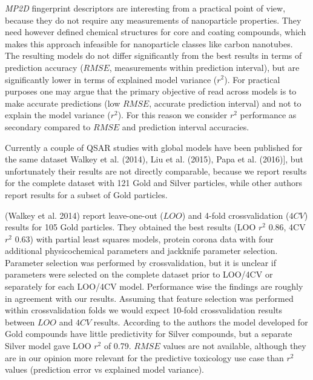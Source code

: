 \documentclass[utf8]{frontiersHLTH} %
\begin{document}
\emph{MP2D} fingerprint descriptors are interesting from a practical
point of view, because they do not require any measurements of
nanoparticle properties. They need however defined chemical structures
for core and coating compounds, which makes this approach infeasible for
nanoparticle classes like carbon nanotubes. The resulting models do not
differ significantly from the best results in terms of prediction
accuracy (\(RMSE\), measurements within prediction interval), but are
significantly lower in terms of explained model variance (\(r^2\)). For
practical purposes one may argue that the primary objective of read
across models is to make accurate predictions (low \(RMSE\), accurate
prediction interval) and not to explain the model variance (\(r^2\)).
For this reason we consider \(r^2\) performance as secondary compared to
\(RMSE\) and prediction interval accuracies.

Currently a couple of QSAR studies with global models have been
published for the same dataset Walkey et al. (2014), Liu et al. (2015),
Papa et al. (2016){]}, but unfortunately their results are not directly
comparable, because we report results for the complete dataset with 121
Gold and Silver particles, while other authors report results for a
subset of Gold particles.

(Walkey et al. 2014) report leave-one-out (\(LOO\)) and 4-fold
crossvalidation (\(4CV\)) results for 105 Gold particles. They obtained
the best results (LOO \(r^2\) 0.86, 4CV \(r^2\) 0.63) with partial least
squares models, protein corona data with four additional physicochemical
parameters and jackknife parameter selection. Parameter selection was
performed by crossvalidation, but it is unclear if parameters were
selected on the complete dataset prior to LOO/4CV or separately for each
LOO/4CV model. Performance wise the findings are roughly in agreement
with our results. Assuming that feature selection was performed within
crossvalidation folds we would expect 10-fold crossvalidation results
between \(LOO\) and \(4CV\) results. According to the authors the model
developed for Gold compounds have little predictivity for Silver
compounds, but a separate Silver model gave LOO \(r^2\) of 0.79.
\(RMSE\) values are not available, although they are in our opinion more
relevant for the predictive toxicology use case than \(r^2\) values
(prediction error vs explained model variance).
\end{document}
